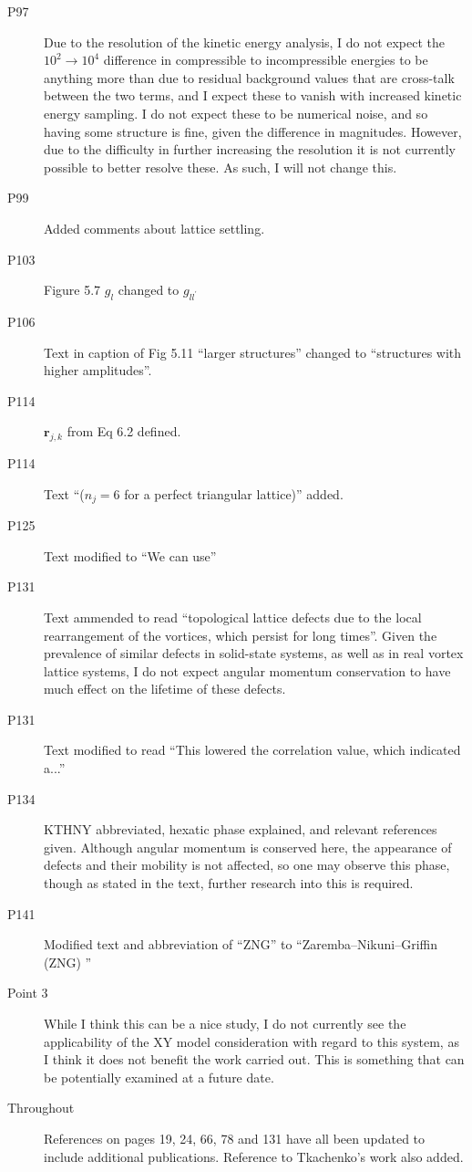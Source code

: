 \documentclass[paper=a4, fontsize=12pt]{scrartcl}
\begin{document}
\begin{description}
    \item [P97] Due to the resolution of the kinetic energy analysis, I do not expect the $10^2 \to 10^4$ difference in compressible to incompressible energies to be anything more than due to residual background values that are cross-talk between the two terms, and I expect these to vanish with increased kinetic energy sampling. I do not expect these to be numerical noise, and so having some structure is fine, given the difference in magnitudes. However, due to the difficulty in further increasing the resolution it is not currently possible to better resolve these. As such, I will not change this.
    \item [P99] Added comments about lattice settling.
    \item [P103] Figure 5.7 $g_l$ changed to $g_{ll^\prime}$
    \item [P106] Text in caption of Fig 5.11 ``larger structures'' changed to ``structures with higher amplitudes''.
    \item [P114] $\mathbf{r}_{j,k}$ from Eq 6.2 defined.
    \item [P114] Text ``($n_j=6$ for a perfect triangular lattice)'' added.
    \item [P125] Text modified to ``We can use''
    \item [P131] Text ammended to read ``topological lattice defects due to the local rearrangement of the vortices, which persist for long times''. Given the prevalence of similar defects in solid-state systems, as well as in real vortex lattice systems, I do not expect angular momentum conservation to have much effect on the lifetime of these defects.
    \item [P131] Text modified to read ``This lowered the correlation value, which indicated a...''
    \item [P134] KTHNY abbreviated, hexatic phase explained, and relevant references given. Although angular momentum is conserved here, the appearance of defects and their mobility is not affected, so one may observe this phase, though as stated in the text, further research into this is required.
    \item [P141] Modified text and abbreviation of ``ZNG'' to ``Zaremba--Nikuni--Griffin (ZNG) ''

    \item [Point 3] While I think this can be a nice study, I do not currently see the applicability of the XY model consideration with regard to this system, as I think it does not benefit the work carried out. This is something that can be potentially examined at a future date.

    \item [Throughout] References on pages 19, 24, 66, 78 and 131 have all been updated to include additional publications. Reference to Tkachenko's work also added.
\end{description}
\end{document}
